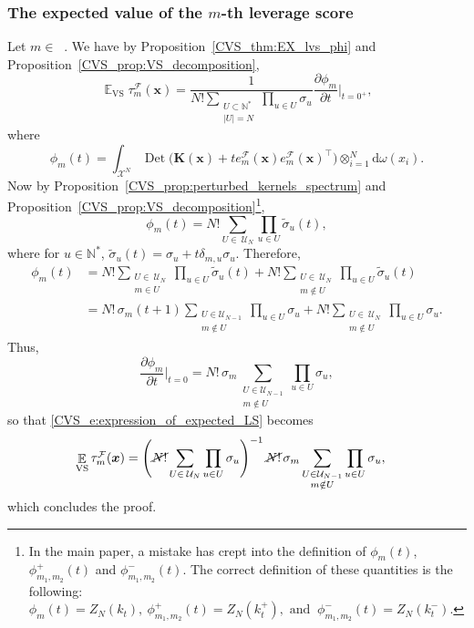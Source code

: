 \documentclass[twoside,11pt]{book}
\numberwithin{theorem}{chapter}
\numberwithin{definition}{chapter}
\numberwithin{proposition}{chapter}
\numberwithin{corollary}{chapter}
\numberwithin{example}{chapter}
\numberwithin{lemma}{chapter}
\numberwithin{assumption}{chapter}
\numberwithin{equation}{chapter}
\numberwithin{figure}{chapter}
\DeclareMathOperator{\Det}{Det}
\DeclareMathOperator{\VS}{\mathrm{VS}}
\DeclareMathOperator{\Tran}{\intercal}
\DeclareMathOperator{\EX}{\mathbb{E}}
\DeclareMathOperator{\F}{\mathcal{F}}
\DeclareMathOperator{\Ns}{\mathbb{N}^{*}}
\def\UN{\:\mathcal{U}_N}
\begin{document}
\subsubsection{The expected value of the $m$-th leverage score}
Let $m \in \Ns$. We have by Proposition~\ref{CVS_thm:EX_lvs_phi} and Proposition~\ref{CVS_prop:VS_decomposition},
\begin{equation}
\EX_{\VS} \tau_{m}^{\F}(\bm{x})  = \frac{1}{N!\sum\limits_{\substack{U \subset \mathbb{N}^{*}\\ |U| = N}} \prod\limits_{u \in U}\sigma_{u}}  \frac{\partial \phi_{m}}{ \partial t }|_{t = 0^{+}},
\label{CVS_e:expression_of_expected_LS}\end{equation}
where
\begin{equation}
\phi_{m}(t) = \int_{\mathcal{X}^{N}} \Det \bigg(\bm{K}(\bm{x})+t e_{m}^{\mathcal{F}}(\bm{x})e_{m}^{\mathcal{F}}(\bm{x})^{\Tran} \bigg) \otimes_{i =1}^{N} \mathrm{d}\omega(x_{i}).
\end{equation}
Now by Proposition~\ref{CVS_prop:perturbed_kernels_spectrum} and Proposition~\ref{CVS_prop:VS_decomposition}\footnote{In the main paper, a mistake has crept into the definition of $\phi_{m}(t)$, $\phi_{m_{1},m_{2}}^{+}(t)$ and $\phi_{m_{1},m_{2}}^{-}(t)$. The correct definition of these quantities is the following: $
\phi_{m}(t) = Z_{N}(k_{t}) , \: \phi_{m_{1},m_{2}}^{+}(t) = Z_{N}(k_{t}^{+}),  \text{ and }\: \phi_{m_{1},m_{2}}^{-}(t) = Z_{N}(k_{t}^{-}). $},
\begin{equation}
\phi_{m}(t) = N! \sum\limits_{U\in\UN} \prod\limits_{u \in U} \tilde{\sigma}_{u}(t),
\end{equation}
where for $u \in \mathbb{N}^{*}$, $\tilde{\sigma}_{u}(t) = \sigma_{u} + t\delta_{m,u}\sigma_{u}$.
Therefore,
\begin{align}
\phi_{m}(t) & = N!\sum\limits_{\substack{U \in\UN \\ m \in U}} \prod\limits_{u \in U} \tilde{\sigma}_{u}(t) + N!\sum\limits_{\substack{U \in\UN \\ m \notin U}} \prod\limits_{u \in U} \tilde{\sigma}_{u}(t) \\
& = N!\,\sigma_{m}(t+1)\sum\limits_{\substack{U\in \mathcal{U}_{N-1}\\ m \notin U}} \prod\limits_{u \in U} \sigma_{u} + N!\sum\limits_{\substack{U \in\UN \\ m \notin U}} \prod\limits_{u \in U} \sigma_{u}.
\end{align}
Thus,  
\begin{equation}
\frac{\partial \phi_{m}}{\partial t}|_{t = 0} = N!\,\sigma_{m}\sum\limits_{\substack{U\in \mathcal{U}_{N-1}\\ m \notin U}} \prod\limits_{u \in U} \sigma_{u},
\end{equation}
so that \eqref{CVS_e:expression_of_expected_LS} becomes
\begin{align}
\EX_{\VS} \tau_{m}^{\F}(\bm{x}) & = \left(\cancel{N!}\sum\limits_{U\in\UN}\prod\limits_{u \in U}\sigma_{u} \right)^{-1} \cancel{N!}\,\sigma_{m}\sum\limits_{\substack{U\in \mathcal{U}_{N-1}\\ m \notin U}} \prod\limits_{u \in U} \sigma_{u},
\end{align}
which concludes the proof.
\end{document}
